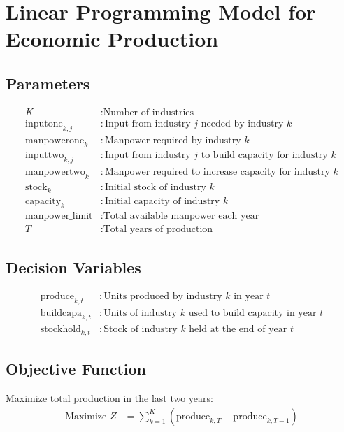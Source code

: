 \documentclass{article}
\begin{document}
\section*{Linear Programming Model for Economic Production}

\subsection*{Parameters}
\begin{align*}
K & : \text{Number of industries} \\
\text{inputone}_{k, j} & : \text{Input from industry } j \text{ needed by industry } k \\
\text{manpowerone}_{k} & : \text{Manpower required by industry } k \\
\text{inputtwo}_{k, j} & : \text{Input from industry } j \text{ to build capacity for industry } k \\
\text{manpowertwo}_{k} & : \text{Manpower required to increase capacity for industry } k \\
\text{stock}_{k} & : \text{Initial stock of industry } k \\
\text{capacity}_{k} & : \text{Initial capacity of industry } k \\
\text{manpower\_limit} & : \text{Total available manpower each year} \\
T & : \text{Total years of production}
\end{align*}

\subsection*{Decision Variables}
\begin{align*}
\text{produce}_{k, t} & : \text{Units produced by industry } k \text{ in year } t \\
\text{buildcapa}_{k, t} & : \text{Units of industry } k \text{ used to build capacity in year } t \\
\text{stockhold}_{k, t} & : \text{Stock of industry } k \text{ held at the end of year } t
\end{align*}

\subsection*{Objective Function}
Maximize total production in the last two years:
\begin{align*}
\text{Maximize } Z & = \sum_{k=1}^{K} \left( \text{produce}_{k, T} + \text{produce}_{k, T-1} \right)
\end{align*}
\end{document}
